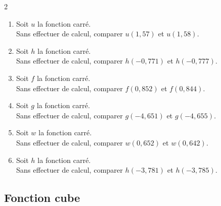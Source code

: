 {%
\begin{Exercice}%
\leavevmode\vspace{-\baselineskip}
\begin{multicols}{2}
\begin{enumerate}[itemsep=1.5em]
	\item \begin{minipage}[t]{\linewidth} Soit $u$ la fonction carré.\\
            Sans effectuer de calcul, comparer $u(1{,}57)$ et $u(1{,}58)$. \end{minipage}
	\item \begin{minipage}[t]{\linewidth} Soit $h$ la fonction carré.\\
            Sans effectuer de calcul, comparer $h(-0{,}771)$ et $h(-0{,}777)$. \end{minipage}
	\item \begin{minipage}[t]{\linewidth} Soit $f$ la fonction carré.\\
            Sans effectuer de calcul, comparer $f(0{,}852)$ et $f(0{,}844)$. \end{minipage}
	\item \begin{minipage}[t]{\linewidth} Soit $g$ la fonction carré.\\
            Sans effectuer de calcul, comparer $g(-4{,}651)$ et $g(-4{,}655)$. \end{minipage}
	\item \begin{minipage}[t]{\linewidth} Soit $w$ la fonction carré.\\
            Sans effectuer de calcul, comparer $w(0{,}652)$ et $w(0{,}642)$. \end{minipage}
	\item \begin{minipage}[t]{\linewidth} Soit $h$ la fonction carré.\\
            Sans effectuer de calcul, comparer $h(-3{,}781)$ et $h(-3{,}785)$. \end{minipage}
\end{enumerate}
\end{multicols}
\end{Exercice}

\newpage

\subsection*{Fonction cube}

}
